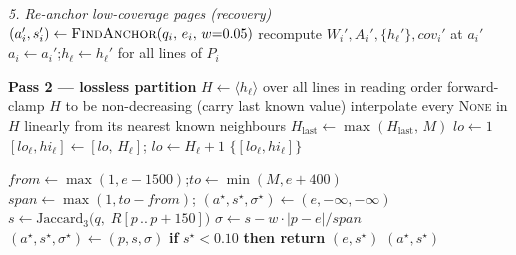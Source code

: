 \begin{algorithm}[htbp]
\begin{algorithmic}[1]
    \Statex \textit{5. Re-anchor low-coverage pages (recovery)}
      \State $(a_i', s_i') \gets \textsc{FindAnchor}(q_i,\, e_i,\, w{=}0.05)$
      \State recompute $W_i', A_i', \{h_\ell'\}, \mathit{cov}_i'$ at $a_i'$
        \State $a_i \gets a_i'$;\quad $h_\ell \gets h_\ell'$ for all lines of $P_i$
      \EndIf
    \EndFor

    \Statex \textbf{Pass 2 --- lossless partition}
    \State $H \gets \langle h_\ell \rangle$ over all lines in reading order
    \State forward-clamp $H$ to be non-decreasing (carry last known value)
    \State interpolate every \textsc{None} in $H$ linearly from its nearest known neighbours
    \State $H_{\text{last}} \gets \max(H_{\text{last}},\, M)$ 
    \State $\mathit{lo}\gets 1$
      \State $[\mathit{lo}_\ell, \mathit{hi}_\ell] \gets [\mathit{lo},\, H_\ell]$;\quad
             $\mathit{lo} \gets H_\ell + 1$
    \EndFor
    \State \Return $\{[\mathit{lo}_\ell, \mathit{hi}_\ell]\}$

    \Statex\hrulefill
      \State $\mathit{from} \gets \max(1, e - 1500)$;\quad $\mathit{to} \gets \min(M, e + 400)$
      \State $\mathit{span} \gets \max(1, \mathit{to} - \mathit{from})$;\quad
             $(a^\star, s^\star, \sigma^\star) \gets (e, -\infty, -\infty)$
        \State $s \gets \mathrm{Jaccard}_3\big(q,\; R[p \,..\, p{+}150]\big)$
        \State $\sigma \gets s - w \cdot |p - e| / \mathit{span}$
        \If{$\sigma > \sigma^\star$} \State $(a^\star, s^\star, \sigma^\star) \gets (p, s, \sigma)$ \EndIf
      \EndFor
      \State \textbf{if } $s^\star < 0.10$ \textbf{ then return } $(e, s^\star)$
      \State \Return $(a^\star, s^\star)$
    \EndFunction
  \end{algorithmic}
\end{algorithm}

